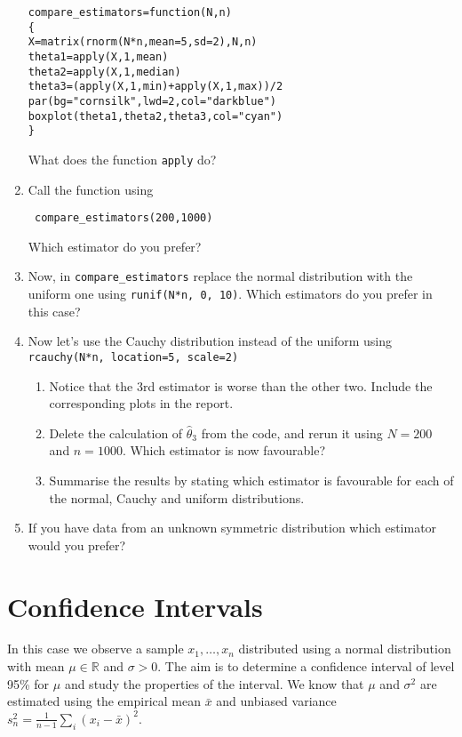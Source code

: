 \documentclass[a4paper,10pt]{article}
\begin{document}
\begin{enumerate}
\begin{lstlisting}
compare_estimators=function(N,n)
{
X=matrix(rnorm(N*n,mean=5,sd=2),N,n)
theta1=apply(X,1,mean)
theta2=apply(X,1,median)
theta3=(apply(X,1,min)+apply(X,1,max))/2
par(bg="cornsilk",lwd=2,col="darkblue")
boxplot(theta1,theta2,theta3,col="cyan")
}
\end{lstlisting}
What does the function \texttt{apply} do? 


\item Call the function using 
\begin{lstlisting}
 compare_estimators(200,1000)
\end{lstlisting}
Which estimator do you prefer? 
\item Now, in \texttt{compare\_estimators} replace the normal distribution with the uniform one using \texttt{runif(N*n, 0, 10)}. Which estimators do you prefer in this case?  
\item Now let's use the Cauchy distribution instead of the uniform using \texttt{rcauchy(N*n, location=5, scale=2)}
\begin{enumerate}
\item Notice that the 3rd estimator is worse than the other two. Include the corresponding plots in the report. 
\item Delete the calculation of $\hat{\theta}_3$ from the code, and rerun it using $N=200$ and $n=1000$. Which estimator is now favourable? 
\item Summarise  the results by stating which estimator is favourable for each of the normal, Cauchy and uniform distributions. 
\end{enumerate}
\item If you have data from an unknown symmetric distribution which estimator would you prefer? 
\end{enumerate}

\section{Confidence Intervals} 

In this case we observe a sample $x_1, \ldots, x_n$ distributed using a normal distribution with mean $\mu \in \mathbb{R}$ and $\sigma > 0$. The aim is to determine a confidence interval of level 95\% for $\mu$ and study the properties of the interval. We know that $\mu$ and $\sigma^2$ are estimated using the empirical mean $\bar{x}$ and unbiased variance $s_n^2 = \frac{1}{n-1} \sum_i (x_i - \bar{x})^2$. 
\end{document}
